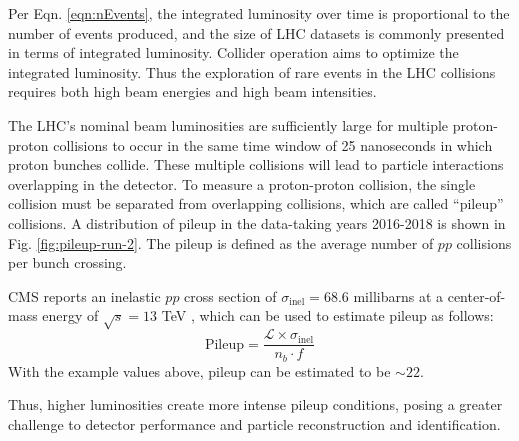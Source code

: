 Per Eqn. \ref{eqn:nEvents}, the integrated luminosity over time is proportional to the number of events produced, and the size of LHC datasets is commonly presented in terms of integrated luminosity. Collider operation aims to optimize the integrated luminosity. Thus the exploration of rare events in the LHC collisions requires both high beam energies and high beam intensities.

The LHC's nominal beam luminosities are sufficiently large for multiple proton-proton collisions to occur in the same time window of 25 nanoseconds in which proton bunches collide. These multiple collisions will lead to particle interactions overlapping in the detector. To measure a proton-proton collision, the single collision must be separated from overlapping collisions, which are called ``pileup'' collisions. A distribution of pileup in the data-taking years 2016-2018 is shown in Fig. \ref{fig:pileup-run-2}. The pileup is defined as the average number of $pp$ collisions per bunch crossing.

CMS reports an inelastic $pp$ cross section of $\sigma_{\text{inel}} = 68.6$ millibarns at a center-of-mass energy of $\sqrt{s} = 13$ TeV \cite{CERN-EP-2018-004-pileup}, which can be used to estimate pileup as follows:
\begin{equation}
    \text{Pileup} = \frac{\mathcal{L} \times \sigma_{\text{inel}}}{ n_b \cdot f}
\end{equation}
With the example values above, pileup can be estimated to be $\sim 22$.

Thus, higher luminosities create more intense pileup conditions, posing a greater challenge to detector performance and particle reconstruction and identification.

